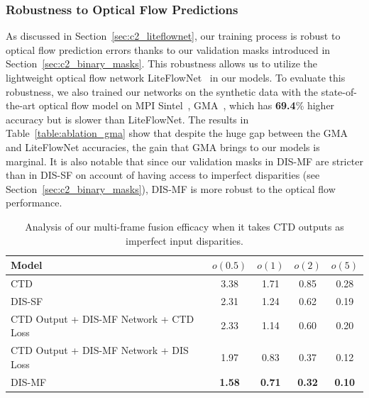 \subsubsection{Robustness to Optical Flow Predictions}
As discussed in Section~\ref{sec:c2_liteflownet}, our training process is robust to optical flow prediction errors thanks to our validation masks introduced in Section~\ref{sec:c2_binary_masks}. This robustness allows us to utilize the lightweight optical flow network LiteFlowNet~\citep{hui2018liteflownet} in our models. To evaluate this robustness, we also trained our networks on the synthetic data with the state-of-the-art optical flow model on MPI Sintel~\citep{butler2012naturalistic}, GMA~\citep{jiang2021learning}, which has \textbf{69.4}\% higher accuracy but is slower than LiteFlowNet. The results in Table~\ref{table:ablation_gma} show that despite the huge gap between the GMA and LiteFlowNet accuracies, the gain that GMA brings to our models is marginal. It is also notable that since our validation masks in DIS-MF are stricter than in DIS-SF on account of having access to imperfect disparities (see Section~\ref{sec:c2_binary_masks}), DIS-MF is more robust to the optical flow performance.


\begin{table}[t]
    \begin{center}
        \begin{tabular}{lcccc}
        \hline
        Model & $o(0.5)$ & $o(1)$ & $o(2)$ & $o(5)$ \\
        \hline
        CTD & 3.38 & 1.71 & 0.85 & 0.28 \\
        DIS-SF & 2.31 & 1.24 & 0.62 & 0.19 \\
        \arrayrulecolor{lightgray}\hline\arrayrulecolor{black}
        CTD Output + DIS-MF Network + CTD Loss & 2.33 & 1.14 & 0.60 & 0.20 \\
        CTD Output + DIS-MF Network + DIS Loss & 1.97 & 0.83 & 0.37 & 0.12 \\
        DIS-MF & \textbf{1.58} & \textbf{0.71} & \textbf{0.32} & \textbf{0.10} \\
        \hline
        \end{tabular}
    \end{center}
    \caption{Analysis of our multi-frame fusion efficacy when it takes CTD outputs as imperfect input disparities.}
    \label{table:ablation_ctd_dis_mf}
\end{table}


